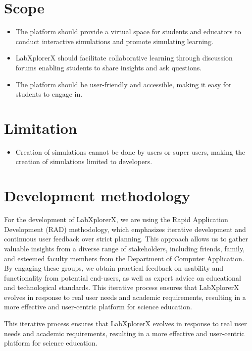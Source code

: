 \section{Scope}

\begin{itemize}
    \item The platform should provide a virtual space for students and educators to conduct interactive simulations and promote simulating learning.
    \item LabXplorerX should facilitate collaborative learning through discussion forums enabling students to share insights and ask questions.
    \item The platform should be user-friendly and accessible, making it easy for students to engage in.
    
\end{itemize}
\section{Limitation}

\begin{itemize}
    \item Creation of simulations cannot be done by users or super users, making the creation of simulations limited to developers.
    
    
\end{itemize}
\section{Development methodology}
For the development of LabXplorerX, we are using the Rapid Application Development (RAD) methodology, which emphasizes iterative development and continuous user feedback over strict planning. This approach allows us to gather valuable insights from a diverse range of stakeholders, including friends, family, and esteemed faculty members from the Department of Computer Application. By engaging these groups, we obtain practical feedback on usability and functionality from potential end-users, as well as expert advice on educational and technological standards. This iterative process ensures that LabXplorerX evolves in response to real user needs and academic requirements, resulting in a more effective and user-centric platform for science education.

This iterative process ensures that LabXplorerX evolves in response to real user needs and academic requirements, resulting in a more effective and user-centric platform for science education.
